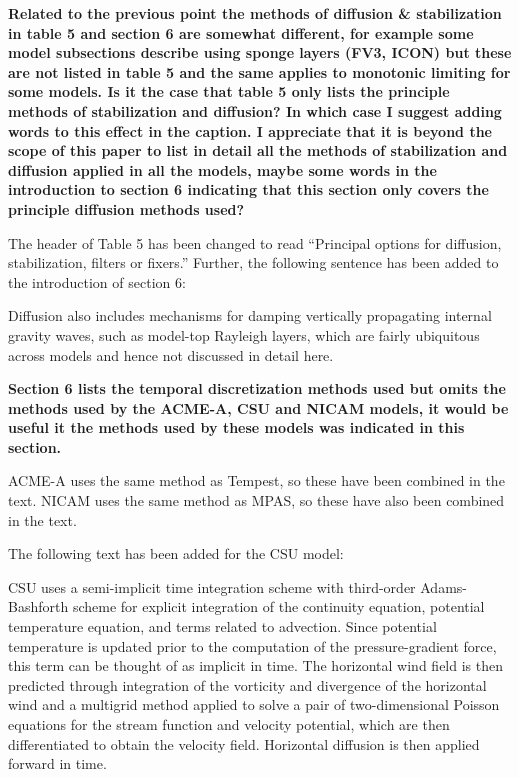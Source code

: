 \documentclass{article}
\begin{document}
\textbf{{Related to the previous point the methods of diffusion \& stabilization in table
5 and section 6 are somewhat different, for example some model subsections describe
using sponge layers (FV3, ICON) but these are not listed in
table 5 and the same applies to monotonic limiting for some models. Is it
the case that table 5 only lists the principle methods of stabilization and diffusion?
In which case I suggest adding words to this effect in the caption.
I appreciate that it is beyond the scope of this paper to list in detail all the
methods of stabilization and diffusion applied in all the models, maybe some
words in the introduction to section 6 indicating that this section only covers
the principle diffusion methods used?}}

The header of Table 5 has been changed to read ``Principal options for diffusion, stabilization, filters or fixers.''  Further, the following sentence has been added to the introduction of section 6:

{\color{blue}Diffusion also includes mechanisms for damping vertically propagating internal gravity waves, such as model-top Rayleigh layers, which are fairly ubiquitous across models and hence not discussed in detail here.}

\textbf{{Section 6 lists the temporal discretization methods used but omits the methods
used by the ACME-A, CSU and NICAM models, it would be useful it the
methods used by these models was indicated in this section.}}

ACME-A uses the same method as Tempest, so these have been combined in the text.  NICAM uses the same method as MPAS, so these have also been combined in the text.

The following text has been added for the CSU model:

{\color{blue}CSU uses a semi-implicit time integration scheme with third-order Adams-Bashforth scheme for explicit integration of the continuity equation, potential temperature equation, and terms related to advection.  Since potential temperature is updated prior to the computation of the pressure-gradient force, this term can be thought of as implicit in time.  The horizontal wind field is then predicted through integration of the vorticity and divergence of the horizontal wind and a multigrid method applied to solve a pair of two-dimensional Poisson equations for the stream function and velocity potential, which are then differentiated to obtain the velocity field.  Horizontal diffusion is then applied forward in time.}
\end{document}
